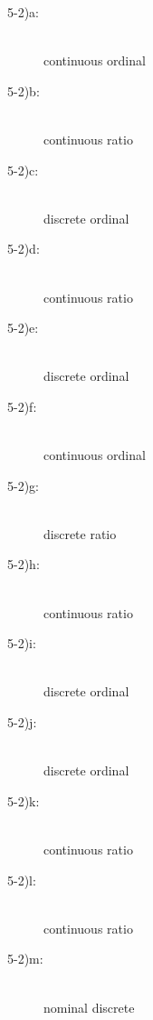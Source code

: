 \documentclass{article}
\begin{document}
\begin{enumerate}
\begin{description}
\item[5-2)a: ] \hfill \\

continuous ordinal

\item[5-2)b:] \hfill \\

continuous ratio

\item[5-2)c:] \hfill \\

discrete  ordinal

\item[5-2)d:] \hfill \\

continuous ratio

\item[5-2)e:] \hfill \\

discrete ordinal

\item[5-2)f:] \hfill \\

continuous ordinal

\item[5-2)g:] \hfill \\

discrete ratio

\item[5-2)h:] \hfill \\

continuous ratio

\item[5-2)i:] \hfill \\

discrete ordinal

\item[5-2)j:] \hfill \\

discrete ordinal

\item[5-2)k:] \hfill \\

continuous ratio

\item[5-2)l:] \hfill \\

continuous ratio

\item[5-2)m:] \hfill \\

nominal discrete


\end{description}
\end{enumerate}
\end{document}

